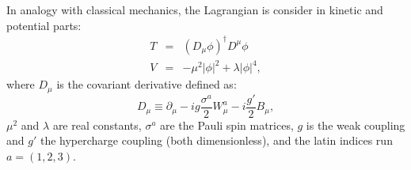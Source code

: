 In analogy with classical mechanics, the Lagrangian is consider in kinetic and potential parts:
\begin{eqnarray}
T &=& \left( D_{\mu} \phi \right) ^{\dagger} D^{\mu} \phi \\
V &=& -\mu^{2} | \phi | ^{2} + \lambda | \phi | ^{4},
\end{eqnarray}
where $D_{\mu}$ is the covariant derivative defined as:
\begin{equation}
D_{\mu} \equiv \partial_{\mu} - ig \frac{\sigma ^{a}}{2} W_{\mu}^{a} - i \frac{g'}{2}B_{\mu},
\end{equation}
$\mu ^{2}$ and $\lambda$ are real constants, $\sigma^{a}$ are the Pauli spin matrices, $g$ is the weak coupling and $g'$ the hypercharge coupling (both dimensionless), and the latin indices run $a = (1,2,3)$.

